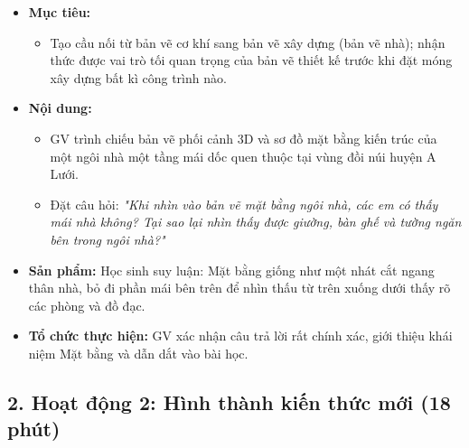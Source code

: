 \documentclass[12pt, a4paper]{article}
\begin{document}
\begin{itemize}[leftmargin=1.2cm]
    \item[a)] \textbf{Mục tiêu:}
    \begin{itemize}[leftmargin=0.6cm]
        \item Tạo cầu nối từ bản vẽ cơ khí sang bản vẽ xây dựng (bản vẽ nhà); nhận thức được vai trò tối quan trọng của bản vẽ thiết kế trước khi đặt móng xây dựng bất kì công trình nào.
    \end{itemize}

    \item[b)] \textbf{Nội dung:}
    \begin{itemize}[leftmargin=0.6cm]
        \item GV trình chiếu bản vẽ phối cảnh 3D và sơ đồ mặt bằng kiến trúc của một ngôi nhà một tầng mái dốc quen thuộc tại vùng đồi núi huyện A Lưới.
        \item Đặt câu hỏi: \textit{"Khi nhìn vào bản vẽ mặt bằng ngôi nhà, các em có thấy mái nhà không? Tại sao lại nhìn thấy được giường, bàn ghế và tường ngăn bên trong ngôi nhà?"}
    \end{itemize}

    \item[c)] \textbf{Sản phẩm:} Học sinh suy luận: Mặt bằng giống như một nhát cắt ngang thân nhà, bỏ đi phần mái bên trên để nhìn thấu từ trên xuống dưới thấy rõ các phòng và đồ đạc.
    \item[d)] \textbf{Tổ chức thực hiện:} GV xác nhận câu trả lời rất chính xác, giới thiệu khái niệm Mặt bằng và dẫn dắt vào bài học.
\end{itemize}

\subsection*{2. Hoạt động 2: Hình thành kiến thức mới (18 phút)}
\end{document}
